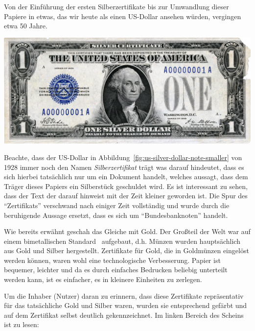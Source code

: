 Von der Einführung der ersten Silberzertifikate bis zur Umwandlung dieser
Papiere in etwas, das wir heute als einen US-Dollar ansehen würden, vergingen
etwa 50 Jahre.

\begin{center}
  \centering
  \includegraphics[width=\textwidth]{assets/images/us-silver-dollar-note-smaller.png}
  \label{fig:us-silver-dollar-note-smaller}
\end{center}

Beachte, dass der US-Dollar in Abbildung~\ref{fig:us-silver-dollar-note-smaller}
von 1928 immer noch den Namen \textit{Silberzertifikat} trägt was darauf
hindeutet, dass es sich hierbei tatsächlich nur um ein Dokument handelt, welches
aussagt, dass dem Träger dieses Papiers ein Silberstück geschuldet wird. Es ist
interessant zu sehen, dass der Text der darauf hinweist mit der Zeit kleiner
geworden ist. Die Spur des \enquote{Zertifikats} verschwand nach einiger Zeit
vollständig und wurde durch die beruhigende Aussage ersetzt, dass es sich um
\enquote{Bundesbanknoten} handelt.

Wie bereits erwähnt geschah das Gleiche mit Gold. Der Großteil der Welt war auf
einem bimetallischen Standard~\cite{wiki:bimetallism} aufgebaut, d.h. Münzen
wurden hauptsächlich aus Gold und Silber hergestellt. Zertifikate für Gold, die
in Goldmünzen eingelöst werden können, waren wohl eine technologische
Verbesserung. Papier ist bequemer, leichter und da es durch einfaches Bedrucken
beliebig unterteilt werden kann, ist es einfacher, es in kleinere Einheiten zu
zerlegen.

Um die Inhaber (Nutzer) daran zu erinnern, dass diese Zertifikate repräsentativ
für das tatsächliche Gold und Silber waren, wurden sie entsprechend gefärbt und
auf dem Zertifikat selbst deutlich gekennzeichnet. Im linken Bereich des Scheins
ist zu lesen:

